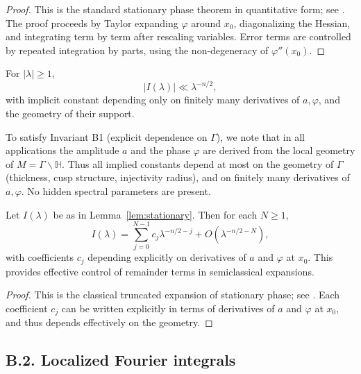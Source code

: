 \begin{proof}
This is the standard stationary phase theorem in quantitative form; see
\cite[Thm.~7.7.5]{Hormander1983}. The proof proceeds by Taylor expanding $\varphi$
around $x_0$, diagonalizing the Hessian, and integrating term by term after
rescaling variables. Error terms are controlled by repeated integration by parts,
using the non-degeneracy of $\varphi''(x_0)$.
\end{proof}

\begin{corollary}\label{cor:uniform-stationary}
For $|\lambda|\ge 1$,
\[
|I(\lambda)| \ll \lambda^{-n/2},
\]
with implicit constant depending only on finitely many derivatives of $a,\varphi$,
and the geometry of their support.
\end{corollary}

\begin{remark}\label{rem:stationary-constants}
To satisfy Invariant B1 (explicit dependence on $\Gamma$), we note that in all
applications the amplitude $a$ and the phase $\varphi$ are derived from the local
geometry of $M=\Gamma\backslash\mathbb H$. Thus all implied constants depend at most
on the geometry of $\Gamma$ (thickness, cusp structure, injectivity radius), and on
finitely many derivatives of $a,\varphi$. No hidden spectral parameters are present.
\end{remark}

\begin{proposition}\label{prop:stationary-error}
Let $I(\lambda)$ be as in Lemma~\ref{lem:stationary}. Then for each $N\ge 1$,
\[
I(\lambda) = \sum_{j=0}^{N-1} c_j \lambda^{-n/2-j} + O(\lambda^{-n/2-N}),
\]
with coefficients $c_j$ depending explicitly on derivatives of $a$ and $\varphi$ at $x_0$.
This provides effective control of remainder terms in semiclassical expansions.
\end{proposition}

\begin{proof}
This is the classical truncated expansion of stationary phase; see
\cite[Chap.~7]{Hormander1983}. Each coefficient $c_j$ can be written explicitly in terms
of derivatives of $a$ and $\varphi$ at $x_0$, and thus depends effectively on the geometry.
\end{proof}

\subsection*{B.2. Localized Fourier integrals}

